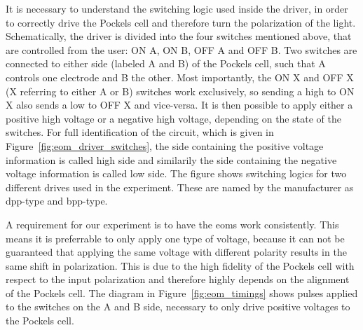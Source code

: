 It is necessary to understand the switching logic used inside the driver, in order to correctly drive the Pockels cell and therefore turn the polarization of the light. Schematically, the driver is divided into the four switches mentioned above, that are controlled from the user: ON A, ON B, OFF A and OFF B. Two switches are connected to either side (labeled A and B) of the Pockels cell, such that A controls one electrode and B the other. Most importantly, the ON X and OFF X (X referring to either A or B) switches work exclusively, so sending a high to ON X also sends a low to OFF X and vice-versa. It is then possible to apply either a positive high voltage or a negative high voltage, depending on the state of the switches. For full identification of the circuit, which is given in Figure~\ref{fig:eom_driver_switches}, the side containing the positive voltage information is called high side and similarily the side containing the negative voltage information is called low side. The figure shows switching logics for two different drives used in the experiment. These are named by the manufacturer as dpp-type and bpp-type.

\begin{figure}[t]%
\end{figure}

A requirement for our experiment is to have the \acp{eom} work consistently. This means it is preferrable to only apply one type of voltage, because it can not be guaranteed that applying the same voltage with different polarity results in the same shift in polarization. This is due to the high fidelity of the Pockels cell with respect to the input polarization and therefore highly depends on the alignment of the Pockels cell. The diagram in Figure~\ref{fig:eom_timings} shows pulses applied to the switches on the A and B side, necessary to only drive positive voltages to the Pockels cell.

